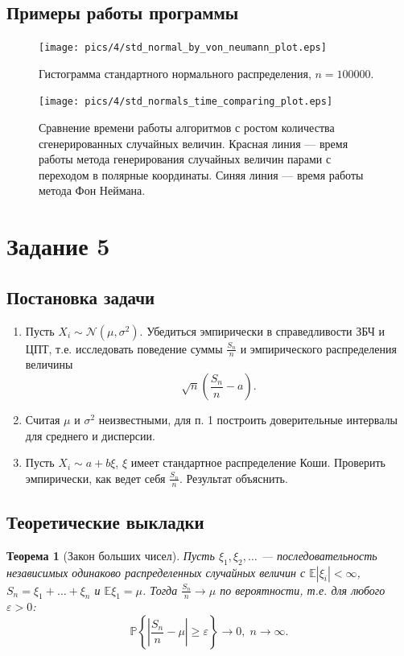 \documentclass[11pt]{article}
\newtheorem{theorem}{Теорема}
\newcommand\abs[1]{\left\lvert#1\right\rvert}
\begin{document}
\subsection{Примеры работы программы}
\begin{figure}[h!]
	\centering
	\texttt{[image: pics/4/std\_normal\_by\_von\_neumann\_plot.eps]}
	\caption{Гистограмма стандартного нормального распределения, $n = 100000$.}
\end{figure}
\begin{figure}[h!]
	\centering
	\texttt{[image: pics/4/std\_normals\_time\_comparing\_plot.eps]}
	\caption{Сравнение времени работы алгоритмов с ростом количества сгенерированных случайных величин. Красная линия --- время работы метода генерирования случайных величин парами с переходом в полярные координаты. Синяя линия --- время работы метода Фон Неймана.}
\end{figure}
\pagebreak
\section{Задание 5}
\subsection{Постановка задачи}
\begin{enumerate}
\item Пусть $X_i \sim \mathcal{N}(\mu, \sigma^2)$. Убедиться эмпирически в справедливости ЗБЧ и ЦПТ, т.е. исследовать поведение суммы $\tfrac{S_n}{n}$ и эмпирического распределения величины
$$
\sqrt{n}\left( \frac{S_n}{n} - a \right).
$$
\item Считая $\mu$ и $\sigma^2$ неизвестными, для п. 1 построить доверительные интервалы для среднего и дисперсии.
\item Пусть $X_i \sim a + b\xi$, $\xi$ имеет стандартное распределение Коши. Проверить эмпирически, как ведет себя $\tfrac{S_n}{n}$. Результат объяснить.
\end{enumerate}
\subsection{Теоретические выкладки}
\begin{theorem}[Закон больших чисел]
Пусть $\xi_1, \xi_2, \ldots$ --- последовательность независимых одинаково распределенных случайных величин с $\mathbb{E}\abs{\xi_i} < \infty$, $S_n = \xi_1 + \ldots + \xi_n$ и $\mathbb{E}\xi_1 = \mu$. Тогда $\frac{S_n}{n} \rightarrow \mu$ по вероятности, т.е. для любого $\varepsilon > 0$:
$$
\mathbb{P}\left\{ \abs{\frac{S_n}{n} - \mu} \geqslant \varepsilon \right\} \rightarrow 0, \; n \rightarrow \infty.
$$
\end{theorem}
\end{document}
